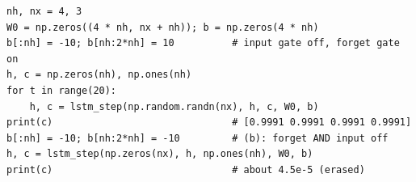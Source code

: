 \begin{enumerate}[label=\textbf{\ansnum.\arabic*}]
\begin{verbatim}
nh, nx = 4, 3
W0 = np.zeros((4 * nh, nx + nh)); b = np.zeros(4 * nh)
b[:nh] = -10; b[nh:2*nh] = 10          # input gate off, forget gate on
h, c = np.zeros(nh), np.ones(nh)
for t in range(20):
    h, c = lstm_step(np.random.randn(nx), h, c, W0, b)
print(c)                               # [0.9991 0.9991 0.9991 0.9991]
b[:nh] = -10; b[nh:2*nh] = -10         # (b): forget AND input off
h, c = lstm_step(np.zeros(nx), h, np.ones(nh), W0, b)
print(c)                               # about 4.5e-5 (erased)
\end{verbatim}
\end{enumerate}
